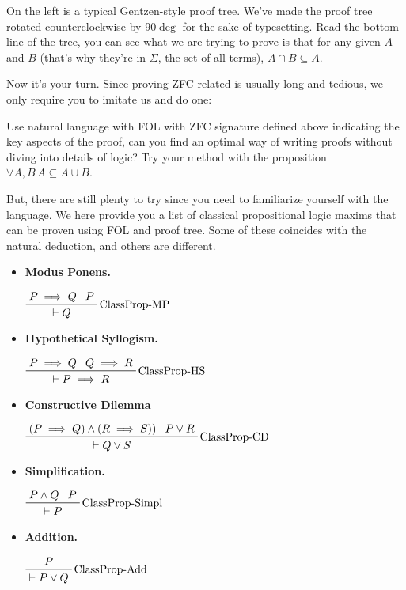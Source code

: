 \documentclass[../main.tex]{subfiles}
\begin{document}
\begin{minipage}[b]{0.6\linewidth}
On the left is a typical Gentzen-style proof tree. We've made the proof tree rotated counterclockwise by $90\deg$ for the sake of typesetting. Read the bottom line of the tree, you can see what we are trying to prove is that for any given $A$ and $B$ (that's why they're in $\Sigma$, the set of all terms), $A\cap B\subseteq A$.

Now it's your turn. Since proving ZFC related is usually long and tedious, we only require you to imitate us and do one:
\begin{exercise}
Use natural language with FOL with ZFC signature defined above indicating the key aspects of the proof, can you find an optimal way of writing proofs without diving into details of logic? Try your method with the proposition $\forall A,B\,A\subseteq A\cup B$.
\end{exercise}
But, there are still plenty to try since you need to familiarize yourself with the language. We here provide you a list of classical propositional logic maxims that can be proven using FOL and proof tree. Some of these coincides with the natural deduction, and others are different.
\begin{itemize}
    \item \textbf{Modus Ponens.} \begin{center}$\prftree[r]{ClassProp-MP}{P\implies Q}{P}{\vdash Q}$\end{center}
    \vspace{-.5cm}\item \textbf{Hypothetical Syllogism.} \begin{center}$\prftree[r]{ClassProp-HS}{P\implies Q}{Q\implies R}{\vdash P\implies R}$\end{center}
    \vspace{-.5cm}\item \textbf{Constructive Dilemma} \begin{center}$\prftree[r]{ClassProp-CD}{(P\implies Q)\land(R\implies S))}{P\lor R}{\vdash Q\lor S}$\end{center}
    \vspace{-.5cm}\item \textbf{Simplification.} \begin{center}$\prftree[r]{ClassProp-Simpl}{P\land Q}{P}{\vdash P}$\end{center}
    \vspace{-.5cm}\item \textbf{Addition.} \begin{center}$\prftree[r]{ClassProp-Add}{P}{\vdash P\lor Q}$\end{center}

\end{itemize}
\end{minipage}
\end{document}
